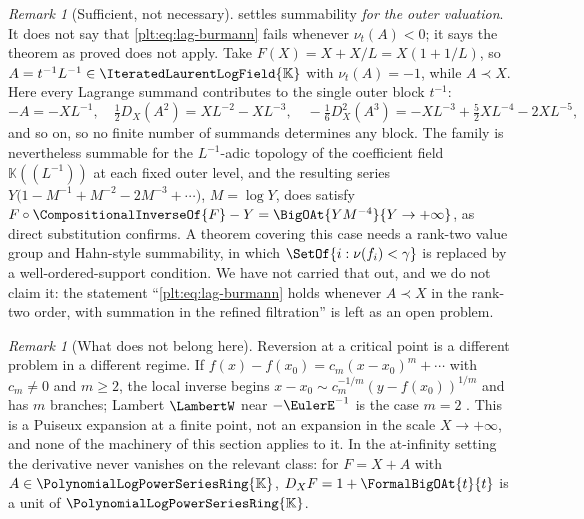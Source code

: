 \documentclass[11pt,oneside]{article}
\theoremstyle{plain}
\theoremstyle{definition}
\theoremstyle{remark}
\newtheorem{remark}[theorem]{Remark}
\newcommand{\K}{\mathbb{K}}
\newcommand{\PLpow}{\PolynomialLogPowerSeriesRing{\K}}   %
\newcommand{\PLit}{\IteratedLaurentLogField{\K}}         %
\newcommand{\ordt}{\nu_{t}}                              %
\newcommand{\DX}{D_{X}}                                  %
\newcommand{\compose}{\mathbin{\circ}}
\newcommand{\rev}[1]{\CompositionalInverseOf{#1}}
\newcommand{\precdom}{\prec}
\begin{document}
\begin{remark}[Sufficient, not necessary]
\label{plt:rmk:lag-rank-two}
 settles summability \emph{for the outer
valuation}.  It does not say that \cref{plt:eq:lag-burmann} fails whenever
\(\ordt(A)<0\); it says the theorem as proved does not apply.  Take
\(F(X)=X+X/L=X(1+1/L)\), so \(A=t^{-1}L^{-1}\in\PLit\) with \(\ordt(A)=-1\),
while \(A\precdom X\).  Here every Lagrange summand contributes to the single
outer block \(t^{-1}\):
\[
  -A=-XL^{-1},\quad
  \tfrac12\DX(A^2)=XL^{-2}-XL^{-3},\quad
  -\tfrac16\DX^{2}(A^3)=-XL^{-3}+\tfrac52XL^{-4}-2XL^{-5},
\]
and so on, so no finite number of summands determines any block.  The family is
nevertheless summable for the \(L^{-1}\)-adic topology of the coefficient field
\(\K((L^{-1}))\) at each fixed outer level, and the resulting series
\(Y\bigl(1-M^{-1}+M^{-2}-2M^{-3}+\cdots\bigr)\), \(M=\log Y\), does satisfy
\(F\compose\rev{F}-Y=\BigOAt{YM^{-4}}{Y\to+\infty}\), as direct substitution
confirms.  A theorem covering this case needs a rank-two value group and
Hahn-style summability, in which \(\SetOf{i:\nu(f_i)<\gamma}\) is replaced by a
well-ordered-support condition.  We have not carried that out, and we do not
claim it: the statement ``\cref{plt:eq:lag-burmann} holds whenever
\(A\precdom X\) in the rank-two order, with summation in the refined
filtration'' is left as an open problem.
\end{remark}

\begin{remark}[What does not belong here]
\label{plt:rmk:lag-branch-point}
Reversion at a critical point is a different problem in a different regime.  If
\(f(x)-f(x_0)=c_m(x-x_0)^m+\cdots\) with \(c_m\ne0\) and \(m\ge2\), the local
inverse begins \(x-x_0\sim c_m^{-1/m}(y-f(x_0))^{1/m}\) and has \(m\) branches;
Lambert \(\LambertW\) near \(-\EulerE^{-1}\) is the case \(m=2\)
\cite{corless-et-al-1996}.  This is a Puiseux expansion at a finite point, not
an expansion in the scale \(X\to+\infty\), and none of the machinery of this
section applies to it.  In the at-infinity setting the derivative never
vanishes on the relevant class: for \(F=X+A\) with \(A\in\PLpow\),
\(\DX F=1+\FormalBigOAt{t}{t}\) is a unit of \(\PLpow\).
\end{remark}
\end{document}
